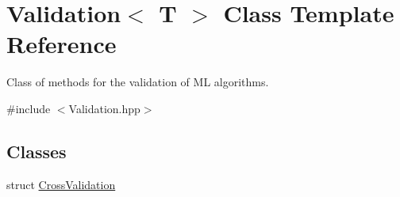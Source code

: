 \hypertarget{class_validation}{}\section{Validation$<$ T $>$ Class Template Reference}
\label{class_validation}


Class of methods for the validation of ML algorithms.  




{\ttfamily \#include $<$Validation.\+hpp$>$}

\subsection*{Classes}
\begin{DoxyCompactItemize}
\item 
struct \hyperlink{struct_validation_1_1_cross_validation}{Cross\+Validation}
\end{DoxyCompactItemize}

